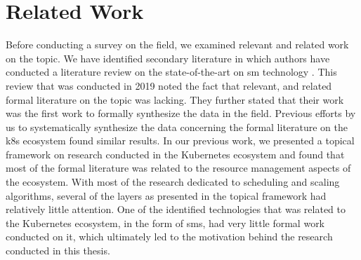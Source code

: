 \section{Related Work}
\label{sec:survey:related-work}

Before conducting a survey on the field, we examined relevant and related work on the topic. We have identified secondary literature in which authors have conducted a literature review on the state-of-the-art on \gls{sm} technology \cite{service-mesh-survey}. This review that was conducted in 2019 noted the fact that relevant, and related formal literature on the topic was lacking. They further stated that their work was the first work to formally synthesize the data in the field. Previous efforts by us to systematically synthesize the data concerning the formal literature on the \gls{k8s} ecosystem found similar results. In our previous work, we presented a topical framework on research conducted in the Kubernetes ecosystem and found that most of the formal literature was related to the resource management aspects of the ecosystem. With most of the research dedicated to scheduling and scaling algorithms, several of the layers as presented in the topical framework had relatively little attention. One of the identified technologies that was related to the Kubernetes ecosystem, in the form of \glspl{sm}, had very little formal work conducted on it, which ultimately led to the motivation behind the research conducted in this thesis.

